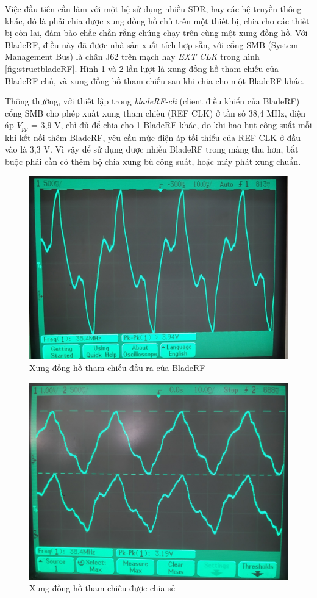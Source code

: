 Việc đầu tiên cần làm với một hệ sử dụng nhiều SDR, hay các hệ truyền thông khác, đó là phải chia được xung đồng hồ chủ trên một thiết bị, chia cho các thiết bị còn lại, đảm bảo chắc chắn rằng chúng chạy trên cùng một xung đồng hồ. Với BladeRF, điều này đã được nhà sản xuất tích hợp sẵn, với cổng SMB (System Management Bus) là chân J62 trên mạch hay \textit{EXT CLK} trong hình \ref{fig:structbladeRF}. Hình \ref{fig:clk} và \ref{fig:shareclk} lần lượt là xung đồng hồ tham chiếu của BladeRF chủ, và xung đồng hồ tham chiếu sau khi chia cho một BladeRF khác. 

Thông thường, với thiết lập trong \textit{bladeRF-cli} (client điều khiển của BladeRF) cổng SMB cho phép xuất xung tham chiếu (REF CLK) ở tần số 38,4 MHz, điện áp $V_{pp}$ = 3,9 V, chỉ đủ để chia cho 1 BladeRF khác, do khi hao hụt công suất mỗi khi kết nối thêm BladeRF, yêu cầu mức điện áp tối thiểu của REF CLK ở đầu vào là 3,3 V. Vì vậy để sử dụng được nhiều BladeRF trong mảng thu hơn, bắt buộc phải cần có thêm bộ chia xung bù công suất, hoặc máy phát xung chuẩn.

\begin{figure} [!h]
	\centering
	\includegraphics[width=0.7\linewidth]{figures/clk.jpg}
	\caption{Xung đồng hồ tham chiếu đầu ra của BladeRF}
	\label{fig:clk}
\end{figure}
\begin{figure} [!h]
	\centering
	\includegraphics[width=0.7\linewidth]{figures/shareclk.jpg}
	\caption{Xung đồng hồ tham chiếu được chia sẻ}
	\label{fig:shareclk}
\end{figure}

